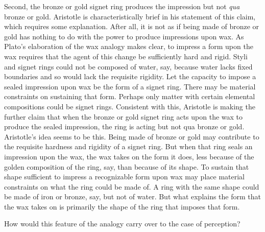Second, the bronze or gold signet ring produces the impression but not \emph{qua} bronze or gold. Aristotle is characteristically brief in his statement of this claim, which requires some explanation. After all, it is not as if being made of bronze or gold has nothing to do with the power to produce impressions upon wax. As Plato's elaboration of the wax analogy makes clear, to impress a form upon the wax requires that the agent of this change be sufficiently hard and rigid. Styli and signet rings could not be composed of water, say, because water lacks fixed boundaries and so would lack the requisite rigidity. Let the capacity to impose a sealed impression upon wax be the form of a signet ring. There may be material constraints on sustaining that form. Perhaps only matter with certain elemental compositions could be signet rings. Consistent with this, Aristotle is making the further claim that when the bronze or gold signet ring acts upon the wax to produce the sealed impression, the ring is acting but not qua bronze or gold. Aristotle's idea seems to be this. Being made of bronze or gold may contribute to the requisite hardness and rigidity of a signet ring. But when that ring seals an impression upon the wax, the wax takes on the form it does, less because of the golden composition of the ring, say, than because of its shape. To sustain that shape sufficient to impress a recognizable form upon wax may place material constraints on what the ring could be made of. A ring with the same shape could be made of iron or bronze, say, but not of water. But what explains the form that the wax takes on is primarily the shape of the ring that imposes that form.

How would this feature of the analogy carry over to the case of perception?

